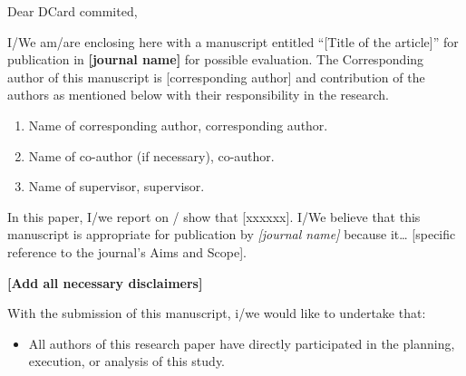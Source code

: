 \documentclass[11pt]{Unicampletter}
\date{\vspace{-6mm} \today}
\makeatletter
\def\Where{\hspace{-1.2mm}\textbf{\color{scured}
		ATM(major), CS(minor), AI(program)\\ National Central University
}}
\def\Address{No. 400, Albert Einstein Avenue}
\def\CityZip{Campinas, São Paulo, Brazil 13083-852%
}
\def\Email{\textbf{\color{scured}e-mail}: fxxxx@unicamp.br}
\def\newaddress{
	\Where\\ 
	\Address\\ 
	\CityZip\\ 
	\Email
}
\makeatother
\begin{document}
	\begin{letter}{
		    }   
%

%
\opening{Dear DCard commited,}

	I/We am/are enclosing here with a manuscript entitled “[Title of the article]” for publication in \textbf{[journal name]} for possible evaluation. The Corresponding author of this manuscript is [corresponding author] and contribution of the authors as mentioned below with their responsibility in the research.
		
		\begin{enumerate}
		    \item Name of corresponding author, corresponding author.
		    
		    \item Name of co-author (if necessary), co-author.
		    
		    \item Name of supervisor, supervisor.
		\end{enumerate}
		
    In this paper, I/we report on / show that [xxxxxx]. I/We believe that this manuscript is appropriate for publication by \textit{[journal name]} because it… [specific reference to the journal’s Aims and Scope].  
		
	\textbf{[Add all necessary disclaimers]}
		

    With the submission of this manuscript, i/we would like to undertake that:
	
	\begin{itemize}
	   \item All authors of this research paper have directly participated in the planning, execution, or analysis of this study.
	        

\end{itemize}
\end{letter}
\end{document}
